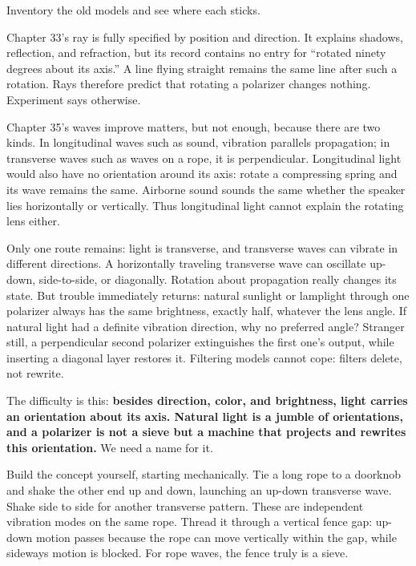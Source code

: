 
Inventory the old models and see where each sticks.

Chapter 33's ray is fully specified by position and direction. It explains shadows, reflection, and refraction, but its record contains no entry for ``rotated ninety degrees about its axis.'' A line flying straight remains the same line after such a rotation. Rays therefore predict that rotating a polarizer changes nothing. Experiment says otherwise.

Chapter 35's waves improve matters, but not enough, because there are two kinds. In longitudinal waves such as sound, vibration parallels propagation; in transverse waves such as waves on a rope, it is perpendicular. Longitudinal light would also have no orientation around its axis: rotate a compressing spring and its wave remains the same. Airborne sound sounds the same whether the speaker lies horizontally or vertically. Thus longitudinal light cannot explain the rotating lens either.

Only one route remains: light is transverse, and transverse waves can vibrate in different directions. A horizontally traveling transverse wave can oscillate up-down, side-to-side, or diagonally. Rotation about propagation really changes its state. But trouble immediately returns: natural sunlight or lamplight through one polarizer always has the same brightness, exactly half, whatever the lens angle. If natural light had a definite vibration direction, why no preferred angle? Stranger still, a perpendicular second polarizer extinguishes the first one's output, while inserting a diagonal layer restores it. Filtering models cannot cope: filters delete, not rewrite.

\begin{mainline}
The difficulty is this: \textbf{besides direction, color, and brightness, light carries an orientation about its axis. Natural light is a jumble of orientations, and a polarizer is not a sieve but a machine that projects and rewrites this orientation.} We need a name for it.
\end{mainline}


Build the concept yourself, starting mechanically. Tie a long rope to a doorknob and shake the other end up and down, launching an up-down transverse wave. Shake side to side for another transverse pattern. These are independent vibration modes on the same rope. Thread it through a vertical fence gap: up-down motion passes because the rope can move vertically within the gap, while sideways motion is blocked. For rope waves, the fence truly is a sieve.

